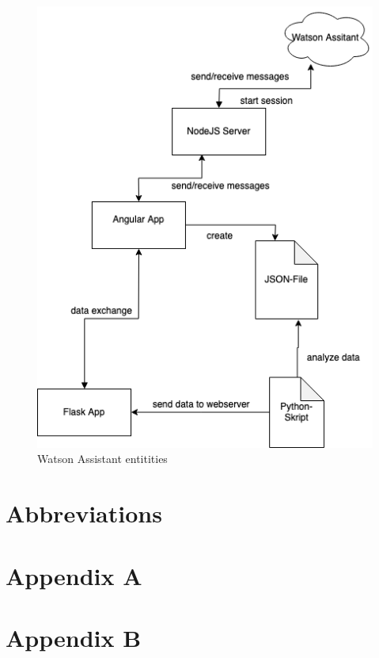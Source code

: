 \begin{figure}[ht]
	\centering
	\includegraphics[width=1\textwidth]{images/architecture_perfectworld.png}
	\caption{Watson Assistant entitities}
	\label{architecture_perfect}
\end{figure}

\chapter{Abbreviations}


\printbibliography[heading=bibintoc]

\chapter{Appendix A}\label{appendix a}

\chapter{Appendix B}\label{appendix b}



